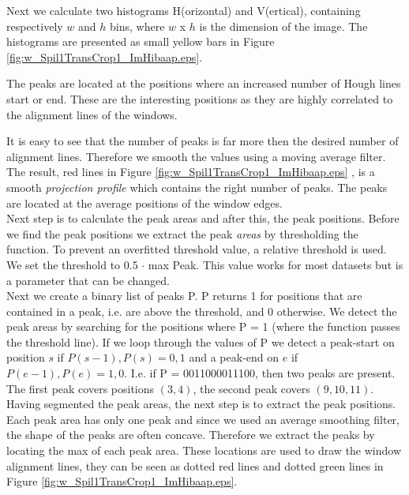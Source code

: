 Next we calculate two histograms H(orizontal) and V(ertical), containing respectively
$w$ and $h$ bins, where $w$ x $h$ is the dimension of the image.  The histograms
are presented as small yellow bars in Figure \ref{fig:w_Spil1TransCrop1_ImHibaap.eps}.

The peaks are located at the positions where an increased number of Hough lines
start or end.  These are the interesting positions as they are highly correlated
to the alignment lines of the windows. 

It is easy to see that the number of peaks is far more then the desired number of alignment lines.
Therefore we smooth the values using a moving average filter.\\

The result, red lines in Figure \ref{fig:w_Spil1TransCrop1_ImHibaap.eps}
, is a smooth \emph{projection profile} which contains the right number of peaks. The peaks
are located at the average positions of the window edges. \\

Next step is to calculate the peak areas and after this, the peak positions. 
Before we find the peak positions we extract the peak \emph{areas} by thresholding the
function. To prevent an overfitted threshold value,  a relative threshold is
used. We set the threshold to 0.5 $\cdot$ max Peak. 
This value works for most datasets but is a parameter that can be changed.\\

Next we create a binary list of peaks P. 
P returns 1 for positions that are contained in
a peak, i.e. are above the threshold, and 0 otherwise.
We detect the peak areas by searching for the positions where P = 1
(where the function passes the threshold line). 
If we loop through the values of P we detect a peak-start on position $s$ if ${P(s-1),P(s)}={0,1}$
and a peak-end on $e$ if ${P(e-1),P(e)}={1,0}$. 
I.e. if P = 0011000011100, then two peaks are present. The first peak covers positions $(3,4)$, 
the second peak covers $(9,10,11)$.\\

Having segmented the peak areas, the next step is to extract the peak positions. 
Each peak area has only one peak and since we used an average smoothing filter, the shape of 
the peaks are often concave. Therefore we extract the peaks by locating the max of each peak area. 
These locations are used to draw the window alignment lines, they can be seen
as dotted red lines and dotted green lines in Figure \ref{fig:w_Spil1TransCrop1_ImHibaap.eps}.


